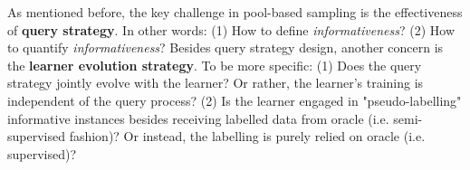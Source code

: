 As mentioned before, the key challenge in pool-based sampling is the effectiveness of \textbf{query strategy}. In other words: (1) How to define \textit{informativeness}? (2) How to quantify \textit{informativeness}? 
Besides query strategy design, another concern is the \textbf{learner evolution strategy}. To be more specific: (1) Does the query strategy jointly evolve with the learner? Or rather, the learner's training is independent of the query process? (2) Is the learner engaged in "pseudo-labelling" informative instances besides receiving labelled data from oracle (i.e. semi-supervised fashion)? Or instead, the labelling is purely relied on oracle (i.e. supervised)? 

